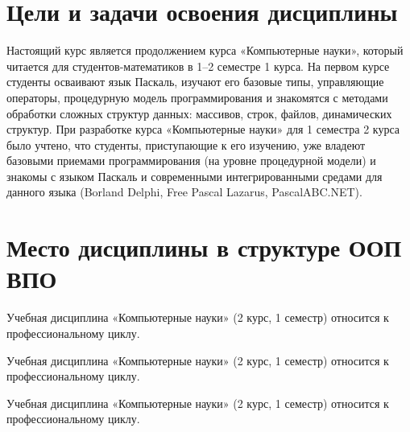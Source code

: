 
\section{Цели и задачи освоения дисциплины}
Настоящий курс является продолжением курса «Компьютерные науки», который 
читается для студентов-математиков в 1–2 семестре 1 курса. На первом курсе 
студенты осваивают язык Паскаль, изучают его базовые типы, управляющие 
операторы, процедурную модель программирования и знакомятся с методами 
обработки сложных структур данных: массивов, строк, файлов, динамических 
структур. При разработке курса «Компьютерные науки» для 1 семестра 2 курса 
было учтено, что студенты, приступающие к его изучению, уже владеют базовыми 
приемами программирования (на уровне процедурной модели) и знакомы с языком 
Паскаль и современными интегрированными средами для данного языка (Borland 
Delphi, Free Pascal Lazarus, PascalABC.NET).

\section{Место дисциплины в структуре ООП ВПО}

\ssect[fff]

Учебная дисциплина «Компьютерные науки» (2 курс, 1 семестр) относится к профессиональному циклу.

\ssect

Учебная дисциплина «Компьютерные науки» (2 курс, 1 семестр) относится к 
профессиональному циклу.

\ssect[ggg]

Учебная дисциплина «Компьютерные науки» (2 курс, 1 семестр) относится к 
профессиональному циклу.


